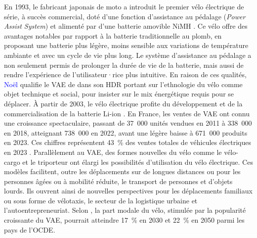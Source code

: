 \begin{refsegment}
En 1993, le fabricant japonais de moto  a introduit le premier vélo électrique de série, à succès commercial, doté d’une fonction d’assistance au pédalage (\textsl{Power Assist System}) et alimenté par d'une batterie amovible \acrshort{NiMH} \textcolor{blue}{\autocite[430]{bertoluzzo_development_2011}}. Ce vélo offre des avantages notables par rapport à la batterie traditionnelle au plomb, en proposant une batterie plus légère, moins sensible aux variations de température ambiante et avec un cycle de vie plus long. Le système d'assistance au pédalage a non seulement permis de prolonger la durée de vie de la batterie, mais aussi de rendre l'expérience de l'utilisateur·rice plus intuitive. En raison de ces qualités, \textcolor{blue}{Noël} \textcolor{blue}{\textcite[25]{jouenne_quest-ce_2022}} qualifie le \acrshort{VAE} de  dans son \acrfull{HDR} portant sur l’ethnologie du vélo comme objet technique et social, pour insister sur le mix énergétique requis pour se déplacer. À partir de 2003, le vélo électrique profite du développement et de la commercialisation de la batterie \acrshort{Li-ion} \textcolor{blue}{\autocite[6]{hung_review_2020}}. En France, les ventes de \acrshort{VAE} ont connu une croissance spectaculaire, passant de 37~000 unités vendues en 2011 à 338~000 en 2018, atteignant 738~000 en 2022, avant une légère baisse à 671~000 produits en 2023. Ces chiffres représentent 43~\% des ventes totales de véhicules électriques en 2023 \textcolor{blue}{\autocite{union_sport__cycle_chiffres_2024}}. Parallèlement au \acrshort{VAE}, des formes nouvelles du vélo comme le vélo-cargo et le triporteur ont élargi les possibilités d’utilisation du vélo électrique. Ces modèles facilitent, outre les déplacements sur de longues distances ou pour les personnes âgées ou à mobilité réduite, le transport de personnes et d’objets lourds. Ils ouvrent ainsi de nouvelles perspectives pour les déplacements familiaux ou sous forme de vélotaxis, le secteur de la logistique urbaine et l'autoentrepreneuriat. Selon \textcolor{blue}{\textcite[24]{mason_global_2015}}, la part modale du vélo, stimulée par la popularité croissante du \acrshort{VAE}, pourrait atteindre 17~\% en 2030 et 22~\% en 2050 parmi les pays de l'\acrfull{OCDE}.%


\end{refsegment}
